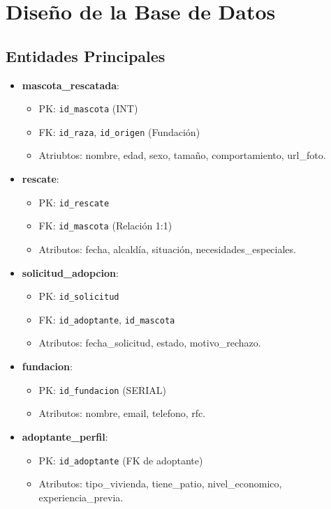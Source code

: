 \documentclass[12pt,a4paper]{article}
\begin{document}
\section{Diseño de la Base de Datos}

\subsection{Entidades Principales}
\begin{itemize}
    \item \textbf{mascota\_rescatada}:
    \begin{itemize}
        \item PK: \texttt{id\_mascota} (INT)
        \item FK: \texttt{id\_raza}, \texttt{id\_origen} (Fundación)
        \item Atriubtos: nombre, edad, sexo, tamaño, comportamiento, url\_foto.
    \end{itemize}
    
    \item \textbf{rescate}:
    \begin{itemize}
        \item PK: \texttt{id\_rescate}
        \item FK: \texttt{id\_mascota} (Relación 1:1)
        \item Atributos: fecha, alcaldía, situación, necesidades\_especiales.
    \end{itemize}

    \item \textbf{solicitud\_adopcion}:
    \begin{itemize}
        \item PK: \texttt{id\_solicitud}
        \item FK: \texttt{id\_adoptante}, \texttt{id\_mascota}
        \item Atributos: fecha\_solicitud, estado, motivo\_rechazo.
    \end{itemize}
    
    \item \textbf{fundacion}:
    \begin{itemize}
        \item PK: \texttt{id\_fundacion} (SERIAL)
        \item Atributos: nombre, email, telefono, rfc.
    \end{itemize}
    
    \item \textbf{adoptante\_perfil}:
    \begin{itemize}
        \item PK: \texttt{id\_adoptante} (FK de adoptante)
        \item Atributos: tipo\_vivienda, tiene\_patio, nivel\_economico, experiencia\_previa.
    \end{itemize}
\end{itemize}
\end{document}
